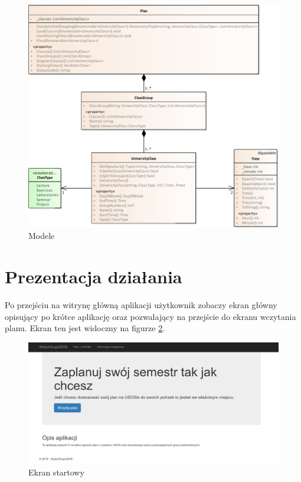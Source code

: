 \documentclass{mwart}
\begin{document}
\begin{figure}[H]
    \centering
    \includegraphics[width=13cm]{klasy.pdf}
    \caption{Modele}
    \label{fig:klasy}
\end{figure}

\section{Prezentacja działania}
Po przejściu na witrynę główną aplikacji użytkownik zobaczy ekran główny opisujący po krótce aplikację oraz pozwalający na przejście do ekranu wczytania planu. Ekran ten jest widoczny na figurze \ref{fig:ekranStartowy}.

\begin{figure}[h]
    \centering
    \includegraphics[width=13cm]{Ekran_startowy}
    \caption{Ekran startowy}
    \label{fig:ekranStartowy}
\end{figure}
\end{document}

